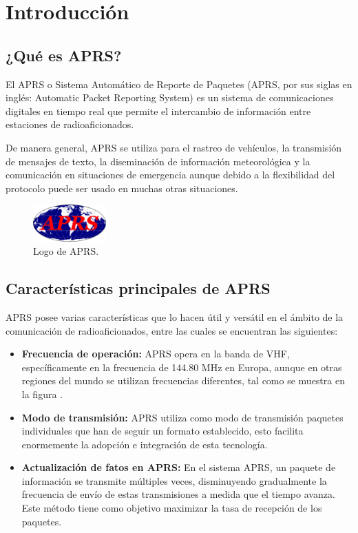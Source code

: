 \chapter{Introducción}
\label{cap:introduccion}

\section{¿Qué es APRS?}

El APRS o Sistema Automático de Reporte de Paquetes (APRS, por sus siglas en inglés: Automatic Packet Reporting System) es un sistema de comunicaciones digitales en tiempo real que permite el intercambio de información entre estaciones de radioaficionados.

De manera general, APRS se utiliza para el rastreo de vehículos, la transmisión de mensajes de texto, la diseminación de información meteorológica y la comunicación en situaciones de emergencia aunque debido a la flexibilidad del protocolo puede ser usado en muchas otras situaciones.

\begin{figure}[h!]
	\centering
	\includegraphics[width=0.25\textwidth]{Imagenes/Chapter_1/APRS_logo.png}
	\caption{Logo de APRS.}
	\label{fig:aprs-logo-es}
\end{figure}

\section{Características principales de APRS}

APRS posee varias características que lo hacen útil y versátil en el ámbito de la comunicación de radioaficionados, entre las cuales se encuentran las siguientes:
\begin{itemize}
	\item \textbf{Frecuencia de operación:} APRS opera en la banda de VHF, específicamente en la frecuencia de 144.80 MHz en Europa, aunque en otras regiones del mundo se utilizan frecuencias diferentes, tal como se muestra en la figura .
	\item \textbf{Modo de transmisión:} APRS utiliza como modo de transmisión paquetes individuales que han de seguir un formato establecido, esto facilita enormemente la adopción e integración de esta tecnología.
	\item \textbf{Actualización de fatos en APRS:} En el sistema APRS, un paquete de información se transmite múltiples veces, disminuyendo gradualmente la frecuencia de envío de estas transmisiones a medida que el tiempo avanza. Este método tiene como objetivo maximizar la tasa de recepción de los paquetes.
\end{itemize}

